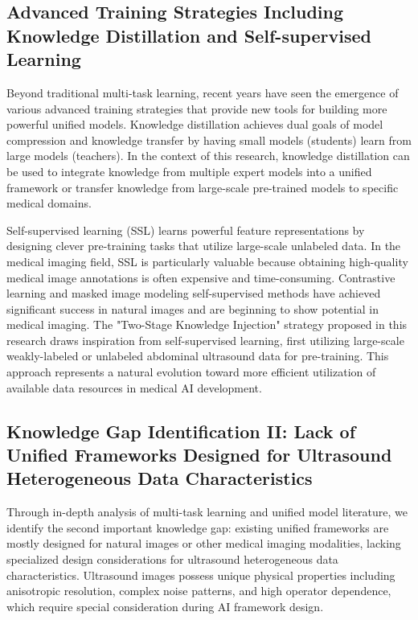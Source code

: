 \subsection{Advanced Training Strategies Including Knowledge Distillation and Self-supervised Learning}

Beyond traditional multi-task learning, recent years have seen the emergence of various advanced training strategies that provide new tools for building more powerful unified models. Knowledge distillation achieves dual goals of model compression and knowledge transfer by having small models (students) learn from large models (teachers). In the context of this research, knowledge distillation can be used to integrate knowledge from multiple expert models into a unified framework or transfer knowledge from large-scale pre-trained models to specific medical domains.

Self-supervised learning (SSL) learns powerful feature representations by designing clever pre-training tasks that utilize large-scale unlabeled data. In the medical imaging field, SSL is particularly valuable because obtaining high-quality medical image annotations is often expensive and time-consuming. Contrastive learning and masked image modeling self-supervised methods have achieved significant success in natural images and are beginning to show potential in medical imaging. The "Two-Stage Knowledge Injection" strategy proposed in this research draws inspiration from self-supervised learning, first utilizing large-scale weakly-labeled or unlabeled abdominal ultrasound data for pre-training. This approach represents a natural evolution toward more efficient utilization of available data resources in medical AI development.

\subsection{Knowledge Gap Identification II: Lack of Unified Frameworks Designed for Ultrasound Heterogeneous Data Characteristics}

Through in-depth analysis of multi-task learning and unified model literature, we identify the second important knowledge gap: existing unified frameworks are mostly designed for natural images or other medical imaging modalities, lacking specialized design considerations for ultrasound heterogeneous data characteristics. Ultrasound images possess unique physical properties including anisotropic resolution, complex noise patterns, and high operator dependence, which require special consideration during AI framework design.

